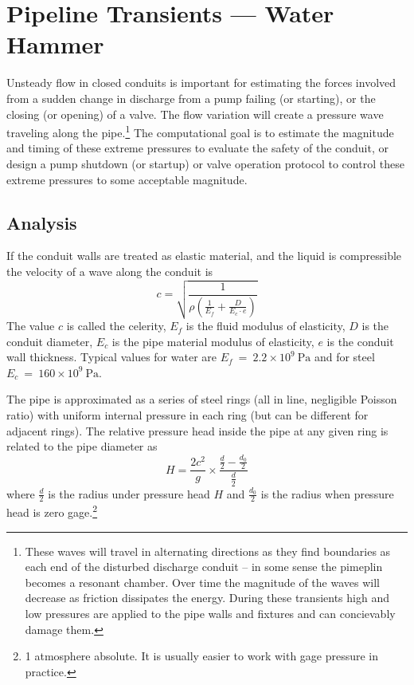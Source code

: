 \section{Pipeline Transients --- Water Hammer}
Unsteady flow in closed conduits is important for estimating the forces involved from a sudden change in discharge from a pump failing (or starting), or the closing (or opening) of a valve.
The flow variation will create a pressure wave traveling along the pipe.\footnote{These waves will travel in alternating directions as they find boundaries as each end of the disturbed discharge conduit -- in some sense the pimeplin becomes a resonant chamber.  Over time the magnitude of the waves will decrease as friction dissipates the energy.  During these transients high and low pressures are applied to the pipe walls and fixtures and can concievably damage them.}
The computational goal is to estimate the magnitude and timing of these extreme pressures to evaluate the safety of the conduit, or design a pump shutdown (or startup) or valve operation protocol to control these extreme pressures to some acceptable magnitude.
\subsection{Analysis}
If the conduit walls are treated as elastic material, and the liquid is compressible the velocity of a wave along the conduit is
\begin{equation}
c = \sqrt{\frac{1}{\rho(\frac{1}{E_f}+\frac{D}{E_c \cdot e})}}
\end{equation}
The value $c$ is called the celerity, $E_f$ is the fluid modulus of elasticity, $D$ is the conduit diameter, $E_c$ is the pipe material modulus of elasticity, $e$ is the conduit wall thickness.
Typical values for water are $E_f~=~2.2 \times 10^9~\text{Pa}$ and for steel $E_c~=~160 \times 10^9~\text{Pa}$.

The pipe is approximated as a series of steel rings (all in line, negligible Poisson ratio) with uniform internal pressure in each ring (but can be different for adjacent rings).
The relative pressure head inside the pipe at any given ring is related to the pipe diameter as
\begin{equation}
H = \frac{2c^2}{g} \times \frac{\frac{d}{2}-\frac{d_0}{2}}{\frac{d}{2}}
\end{equation}
where $\frac{d}{2}$ is the radius under pressure head $H$ and $\frac{d_0}{2}$ is the radius when pressure head is zero gage.\footnote{1 atmosphere absolute.  It is usually easier to work with gage pressure in practice.}

